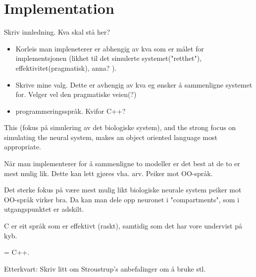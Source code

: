
\chapter{Implementation} %

Skriv innledning. Kva skal stå her?
\begin{itemize}
	\item Korleis man impleneterer er abhengig av kva som er målet for implementsjonen (likhet til det simulerte systemet("retthet"), effektivitet(pragmatisk), anna? ). 
	\item Skrive mine valg. Dette er avhengig av kva eg ønsker å sammenligne systemet for. Velger vel den pragmatiske veien(?)
	\item programmeringsspråk. Kvifor C++?
\end{itemize}

	This (fokus på simulering av det biologiske system), and the strong focus on simulating the neural system, makes an object oriented language most appropriate. 



	Når man implementerer for å sammenligne to modeller er det best at de to er mest mulig lik. Dette kan lett gjøres vha. arv. Peiker mot OO-språk.
	
	Det sterke fokus på være mest mulig likt biologiske neurale system peiker mot OO-språk virker bra. Da kan man dele opp neuronet i "compartments", som i utgangspunktet er adskilt.

	C er eit språk som er effektivt (raskt), samtidig som det har vore undervist på kyb.

	= C++.

	Etterkvart: Skriv litt om Stroustrup's anbefalinger om å bruke stl.




